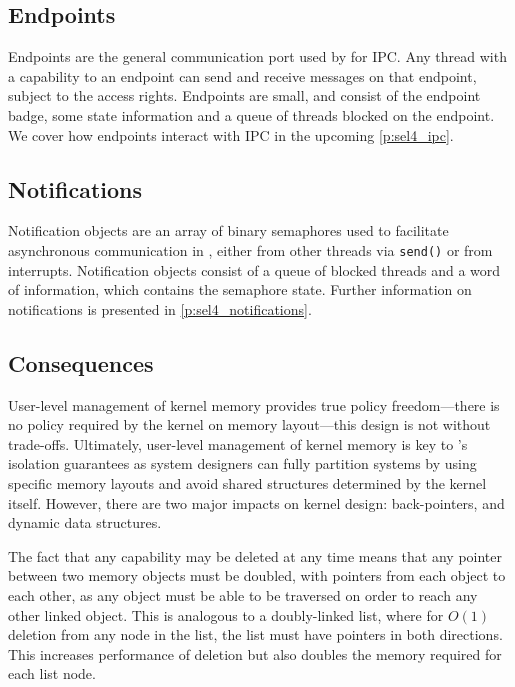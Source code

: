 \subsection{Endpoints}
\label{s:endpoints}

Endpoints are the general communication port used by \selfour for \gls{IPC}.
Any thread with a
capability to an endpoint can send and receive messages on that endpoint, subject to the access
rights. Endpoints are small, and consist of the endpoint badge, some state information and a queue
of threads blocked on the endpoint. We cover how endpoints interact with IPC in the upcoming
\cref{p:sel4_ipc}. 

\subsection{Notifications}

Notification objects are an array of binary semaphores used to facilitate asynchronous communication in \selfour, either from other threads via \texttt{send()} or from
interrupts. Notification objects consist of a queue of blocked threads and a word of information,
which contains the semaphore state. Further information on notifications is presented in
\cref{p:sel4_notifications}. 

\subsection{Consequences}

User-level management of kernel memory provides true policy freedom---there is no
policy required by the kernel on memory layout---this design is not without trade-offs. Ultimately,
user-level management of kernel memory is key to \selfour's isolation
guarantees as system designers can fully partition systems by using specific memory layouts and
avoid shared structures determined by the kernel itself. However, there are two major impacts on kernel 
design: back-pointers, and dynamic data structures. 

The fact that any capability may be deleted at any time means that any pointer between two memory
objects must be doubled, with pointers from each object to each other, as any object must be able to be
traversed on order to reach any other linked object. This is analogous to a doubly-linked list,
where for $O(1)$ deletion from any node in the list, the list must have pointers in both directions.
This increases performance of deletion but also doubles the memory required for each list node. 

